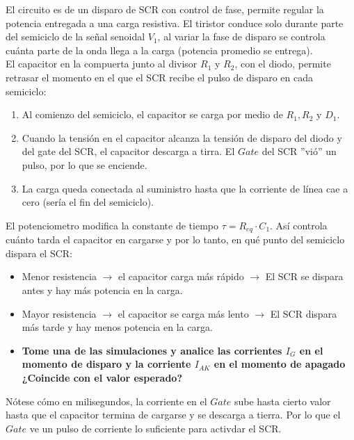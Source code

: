 \sangria{} El circuito es de un disparo de SCR con control de fase, permite regular la potencia entregada a una carga resistiva. El tiristor conduce solo durante parte del semiciclo de la señal senoidal $V_1$, al variar la fase de disparo se controla cuánta parte de la onda llega a la carga (potencia promedio se entrega). \\ \sangria{} El capacitor en la compuerta junto al divisor $R_1$ y $R_2$, con el diodo, permite retrasar el momento en el que el SCR recibe el pulso de disparo en cada semiciclo:
\begin{enumerate}[nosep]
    \item Al comienzo del semiciclo, el capacitor se carga por medio de $R_1, R_2 \text{ y } D_1$.
    \item Cuando la tensión en el capacitor alcanza la tensión de disparo del diodo y del gate del SCR, el capacitor descarga a tirra. El $Gate$ del SCR ''vió'' un pulso, por lo que se enciende.
    \item La carga queda conectada al suministro hasta que la corriente de línea cae a cero (sería el fin del semiciclo).\\
\end{enumerate}
\sangria{} El potenciometro modifica la constante de tiempo $\tau = R_{eq} \cdot C_1$. Así controla cuánto tarda el capacitor en cargarse y por lo tanto, en qué punto del semiciclo dispara el SCR:

\begin{itemize}[nosep]
    \item Menor resistencia $\rightarrow$ el capacitor carga más rápido $\rightarrow$ El SCR se dispara antes y hay más potencia en la carga.
    \item Mayor resistencia $\rightarrow$ el capacitor se carga más lento $\rightarrow$ El SCR dispara más tarde y hay menos potencia en la carga.\\[5pt]
\end{itemize}



\begin{itemize}[nosep]
    \item \textbf{Tome una de las simulaciones y analice las corrientes $I_G$ en el momento de disparo y la corriente $I_{AK}$ en el momento de apagado ¿Coincide con el valor esperado?}
\end{itemize}

\sangria{} Nótese cómo en milisegundos, la corriente en el $Gate$ sube hasta cierto valor hasta que el capacitor termina de cargarse y se descarga a tierra. Por lo que el $Gate$ ve un pulso de corriente lo suficiente para activdar el SCR.

